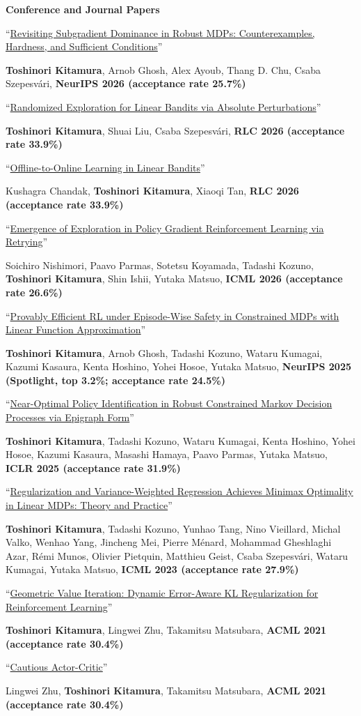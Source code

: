 \documentclass[10pt]{article}
\newcommand{\me}{\textbf{\color{darktext}Toshinori Kitamura}}
\newcommand{\cvsubsection}[1]{%
  \par\vspace{5pt}%
  {\regularfont\bfseries\fontsize{11}{13}\selectfont\color{darktext}#1}%
  \par\vspace{1pt}}
\newcommand{\paper}[4]{%
  \item ``\href{#1}{#2}''\par
  {\color{graytext}#3, \textbf{\color{darktext}#4}}}
\begin{document}
\cvsubsection{Conference and Journal Papers}
\begin{cvitems}
  \paper{https://arxiv.org/abs/2604.21177}
    {Revisiting Subgradient Dominance in Robust MDPs: Counterexamples, Hardness, and Sufficient Conditions}
    {\me, Arnob Ghosh, Alex Ayoub, Thang D. Chu, Csaba Szepesvári}
    {NeurIPS 2026 (acceptance rate 25.7\%)}
  \paper{https://arxiv.org/abs/2606.28616}
    {Randomized Exploration for Linear Bandits via Absolute Perturbations}
    {\me, Shuai Liu, Csaba Szepesvári}
    {RLC 2026 (acceptance rate 33.9\%)}
  \paper{https://arxiv.org/abs/2606.04305}
    {Offline-to-Online Learning in Linear Bandits}
    {Kushagra Chandak, \me, Xiaoqi Tan}
    {RLC 2026 (acceptance rate 33.9\%)}
  \paper{https://arxiv.org/abs/2606.00151}
    {Emergence of Exploration in Policy Gradient Reinforcement Learning via Retrying}
    {Soichiro Nishimori, Paavo Parmas, Sotetsu Koyamada, Tadashi Kozuno, \me, Shin Ishii, Yutaka Matsuo}
    {ICML 2026 (acceptance rate 26.6\%)}
  \paper{https://arxiv.org/abs/2502.10138}
    {Provably Efficient RL under Episode-Wise Safety in Constrained MDPs with Linear Function Approximation}
    {\me, Arnob Ghosh, Tadashi Kozuno, Wataru Kumagai, Kazumi Kasaura, Kenta Hoshino, Yohei Hosoe, Yutaka Matsuo}
    {NeurIPS 2025 (Spotlight, top 3.2\%; acceptance rate 24.5\%)}
  \paper{https://arxiv.org/abs/2408.16286}
    {Near-Optimal Policy Identification in Robust Constrained Markov Decision Processes via Epigraph Form}
    {\me, Tadashi Kozuno, Wataru Kumagai, Kenta Hoshino, Yohei Hosoe, Kazumi Kasaura, Masashi Hamaya, Paavo Parmas, Yutaka Matsuo}
    {ICLR 2025 (acceptance rate 31.9\%)}
  \paper{https://arxiv.org/abs/2305.13185}
    {Regularization and Variance-Weighted Regression Achieves Minimax Optimality in Linear MDPs: Theory and Practice}
    {\me, Tadashi Kozuno, Yunhao Tang, Nino Vieillard, Michal Valko, Wenhao Yang, Jincheng Mei, Pierre Ménard, Mohammad Gheshlaghi Azar, Rémi Munos, Olivier Pietquin, Matthieu Geist, Csaba Szepesvári, Wataru Kumagai, Yutaka Matsuo}
    {ICML 2023 (acceptance rate 27.9\%)}
  \paper{https://proceedings.mlr.press/v157/kitamura21a}
    {Geometric Value Iteration: Dynamic Error-Aware KL Regularization for Reinforcement Learning}
    {\me, Lingwei Zhu, Takamitsu Matsubara}
    {ACML 2021 (acceptance rate 30.4\%)}
  \paper{https://proceedings.mlr.press/v157/zhu21a.html}
    {Cautious Actor-Critic}
    {Lingwei Zhu, \me, Takamitsu Matsubara}
    {ACML 2021 (acceptance rate 30.4\%)}
\end{cvitems}
\end{document}
